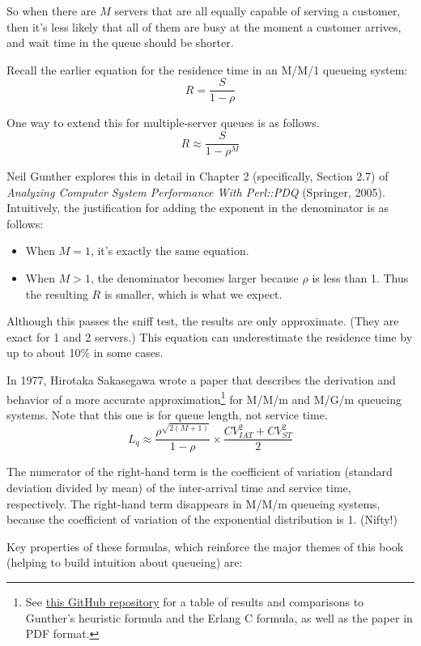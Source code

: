 \documentclass{vivid_layout}
\begin{document}
So when there are \( M \) servers that are all equally capable of serving a customer, then it's less likely that all of them are busy at the moment a customer arrives, and wait time in the queue should be shorter. 

Recall the earlier equation for the residence time in an M/M/1 queueing system:
\[
  R = \frac{S}{1 - \rho}
\]

One way to extend this for multiple-server queues is as follows.
\[
  R \approx \frac{S}{ 1-\rho^M }
\]

Neil Gunther explores this in detail in Chapter 2 (specifically, Section 2.7) of {\itshape Analyzing Computer System Performance With Perl::PDQ} (Springer, 2005). Intuitively, the justification for adding the exponent in the denominator is as follows:

\begin{itemize}
\item When \( M=1 \), it's exactly the same equation.
\item When \( M > 1 \), the denominator becomes larger because \( \rho \) is less than 1. Thus the resulting \( R \) is smaller, which is what we expect.
\end{itemize}

Although this passes the sniff test, the results are only approximate. (They are exact for 1 and 2 servers.) This equation can underestimate the residence time by up to about 10\% in some cases.

In 1977, Hirotaka Sakasegawa wrote a paper that describes the derivation and behavior of a more accurate approximation\footnote{See \href{https://github.com/VividCortex/approx-queueing-theory}{this GitHub repository} for a table of results and comparisons to Gunther's heuristic formula and the Erlang C formula, as well as the paper in PDF format.} for M/M/m and M/G/m queueing systems. Note that this one is for queue length, not service time.
\[
L_q \approx \frac{ \rho^{\sqrt{2(M+1)}} }{ 1-\rho} \times \frac {CV_{IAT}^2 + CV_{ST}^2}{2}
\]

The numerator of the right-hand term is the coefficient of variation (standard deviation divided by mean) of the inter-arrival time and service time, respectively. The right-hand term disappears in M/M/m queueing systems, because the coefficient of variation of the exponential distribution is 1. (Nifty!)

Key properties of these formulas, which reinforce the major themes of this book (helping to build intuition about queueing) are:
\end{document}
